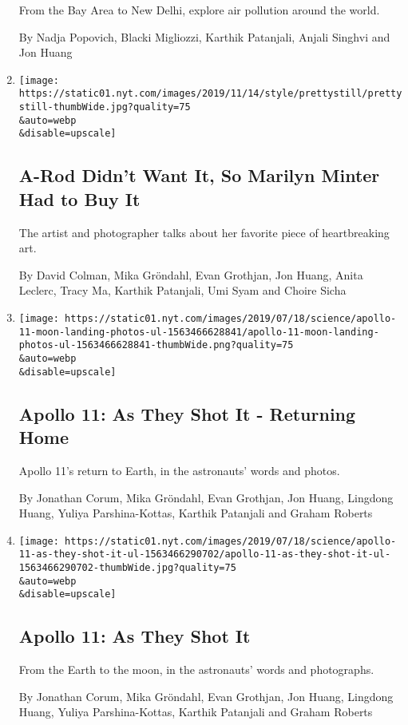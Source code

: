 \begin{enumerate}
  From the Bay Area to New Delhi, explore air pollution around the
  world.

  By Nadja Popovich, Blacki Migliozzi, Karthik Patanjali, Anjali Singhvi
  and Jon Huang
\item
  \href{/interactive/2019/11/14/style/possessed-kara-walker.html}{}

  \texttt{[image: https://static01.nyt.com/images/2019/11/14/style/prettystill/prettystill-thumbWide.jpg?quality=75\\\&auto=webp\\\&disable=upscale]}

  \hypertarget{a-rod-didnt-want-it-so-marilyn-minter-had-to-buy-it}{%
  \subsection{A-Rod Didn't Want It, So Marilyn Minter Had to Buy
  It}\label{a-rod-didnt-want-it-so-marilyn-minter-had-to-buy-it}}

  The artist and photographer talks about her favorite piece of
  heartbreaking art.

  By David Colman, Mika Gröndahl, Evan Grothjan, Jon Huang, Anita
  Leclerc, Tracy Ma, Karthik Patanjali, Umi Syam and Choire Sicha
\item
  \href{/interactive/2019/07/18/science/apollo-11-moon-earth-photos-ul.html}{}

  \texttt{[image: https://static01.nyt.com/images/2019/07/18/science/apollo-11-moon-landing-photos-ul-1563466628841/apollo-11-moon-landing-photos-ul-1563466628841-thumbWide.png?quality=75\\\&auto=webp\\\&disable=upscale]}

  \hypertarget{apollo-11-as-they-shot-it---returning-home}{%
  \subsection{Apollo 11: As They Shot It - Returning
  Home}\label{apollo-11-as-they-shot-it---returning-home}}

  Apollo 11's return to Earth, in the astronauts' words and photos.

  By Jonathan Corum, Mika Gröndahl, Evan Grothjan, Jon Huang, Lingdong
  Huang, Yuliya Parshina-Kottas, Karthik Patanjali and Graham Roberts
\item
  \href{/interactive/2019/07/18/science/apollo-11-as-they-shot-it-ul.html}{}

  \texttt{[image: https://static01.nyt.com/images/2019/07/18/science/apollo-11-as-they-shot-it-ul-1563466290702/apollo-11-as-they-shot-it-ul-1563466290702-thumbWide.jpg?quality=75\\\&auto=webp\\\&disable=upscale]}

  \hypertarget{apollo-11-as-they-shot-it}{%
  \subsection{Apollo 11: As They Shot
  It}\label{apollo-11-as-they-shot-it}}

  From the Earth to the moon, in the astronauts' words and photographs.

  By Jonathan Corum, Mika Gröndahl, Evan Grothjan, Jon Huang, Lingdong
  Huang, Yuliya Parshina-Kottas, Karthik Patanjali and Graham Roberts
\end{enumerate}


